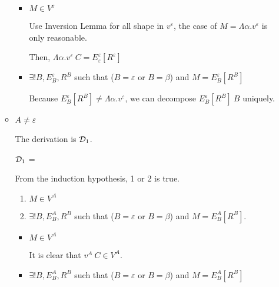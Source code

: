 \begin{itemize}
\begin{itemize}
	      	      \begin{itemize}
	      	      	\item $ M \in V^\varepsilon$
	      	      	      	      	      	      
	      	      	      Use Inversion Lemma for all shape in $v^\varepsilon$, the case of $ M = \Lambda\alpha.v^\varepsilon$ is only reasonable.
	      	      	      	      	      	      
	      	      	      Then, $ \Lambda\alpha.v^\varepsilon\ C = E^\varepsilon_\varepsilon [R^\varepsilon]$
	      	      	\item $\exists ! B, E^\varepsilon_B, R^B$ such that ($B = \varepsilon$ or $B = \beta$) and $M = E^\varepsilon_B[R^B]$
	      	      	      	      	      	      
	      	      	      Because $ E^\varepsilon_B[R^B] \neq \Lambda\alpha.v^\varepsilon$, we can decompose $E^\varepsilon_B[R^B]\ B$ uniquely.
	      	      \end{itemize}
	      	      	      	      
	      	\item $ A \neq \varepsilon $
	      	      	      	      
	      	      The derivation is $\mathcal{D}_1$.
	      	      	      	      
	      	      $\mathcal{D}_1$ = 
	      	      {}
	      	      	      	      
	      	      From the induction hypothesis, 1 or 2 is true.
	      	      	      	      
	      	      \begin{enumerate}
	      	      	\item $ M \in V^A$
	      	      	\item $\exists ! B, E^A_B, R^B$ such that ($B = \varepsilon$ or $B = \beta$) and $M = E^A_B[R^B]$.
	      	      \end{enumerate}
	      	      	      	      
	      	      \begin{itemize}
	      	      	\item $ M \in V^A$
	      	      	      	      	      	      
	      	      	      It is clear that $v^A\ C \in V^A$.
	      	      	      	      	      	      
	      	      	\item $\exists ! B, E^A_B, R^B$ such that ($B = \varepsilon$ or $B = \beta$) and $M = E^A_B[R^B]$
	      	      	      	      	      	      

\end{itemize}
\end{itemize}
\end{itemize}
